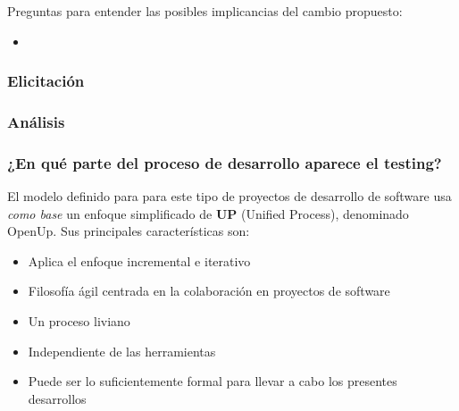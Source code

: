     Preguntas para entender las posibles implicancias del cambio propuesto:
    
    \begin{itemize}
        \item 
    \end{itemize}
    
    \subsubsection*{Elicitación}
    
    
    
    \subsubsection*{Análisis}
    
    
    \subsubsection*{¿En qué parte del proceso de desarrollo aparece el testing?}     
    
    El modelo definido para para este tipo de proyectos de desarrollo de software usa \textit{como base} un enfoque simplificado de \textbf{UP} (Unified Process), denominado OpenUp. Sus principales características son:
    
    \begin{itemize}
        \item Aplica el enfoque incremental e iterativo
        \item Filosofía ágil centrada en la colaboración en proyectos de software
        \item Un proceso liviano
        \item Independiente de las herramientas
        \item Puede ser lo suficientemente formal para llevar a cabo los presentes desarrollos
    \end{itemize}
    
